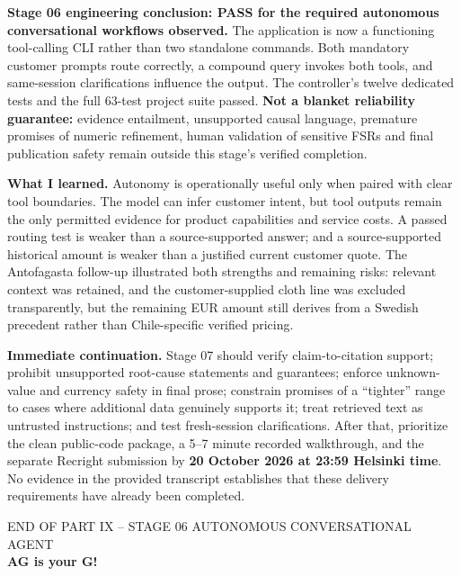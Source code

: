 \documentclass[11pt,a4paper]{article}
\begin{document}
\begin{keybox}
\textbf{Stage 06 engineering conclusion: PASS for the required autonomous conversational workflows observed.} The application is now a functioning tool-calling CLI rather than two standalone commands. Both mandatory customer prompts route correctly, a compound query invokes both tools, and same-session clarifications influence the output. The controller's twelve dedicated tests and the full 63-test project suite passed. \textbf{Not a blanket reliability guarantee:} evidence entailment, unsupported causal language, premature promises of numeric refinement, human validation of sensitive FSRs and final publication safety remain outside this stage's verified completion.
\end{keybox}

\textbf{What I learned.} Autonomy is operationally useful only when paired with clear tool boundaries. The model can infer customer intent, but tool outputs remain the only permitted evidence for product capabilities and service costs. A passed routing test is weaker than a source-supported answer; and a source-supported historical amount is weaker than a justified current customer quote. The Antofagasta follow-up illustrated both strengths and remaining risks: relevant context was retained, and the customer-supplied cloth line was excluded transparently, but the remaining EUR amount still derives from a Swedish precedent rather than Chile-specific verified pricing.

\textbf{Immediate continuation.} Stage 07 should verify claim-to-citation support; prohibit unsupported root-cause statements and guarantees; enforce unknown-value and currency safety in final prose; constrain promises of a ``tighter'' range to cases where additional data genuinely supports it; treat retrieved text as untrusted instructions; and test fresh-session clarifications. After that, prioritize the clean public-code package, a 5--7 minute recorded walkthrough, and the separate Recright submission by \textbf{20 October 2026 at 23:59 Helsinki time}. No evidence in the provided transcript establishes that these delivery requirements have already been completed.

\vspace{4mm}
\begin{center}
{\sffamily\color{Gray}\footnotesize END OF PART IX -- STAGE 06 AUTONOMOUS CONVERSATIONAL AGENT}\\[2mm]
{\sffamily\bfseries\color{Navy}AG is your G!}
\end{center}
\end{document}
